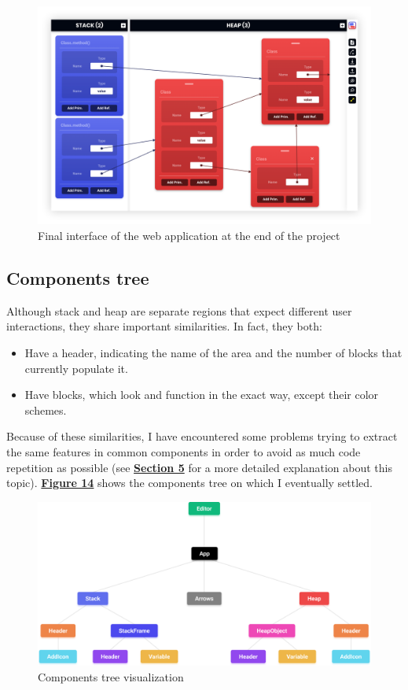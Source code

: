 \documentclass[]{usiinfbachelorproject}
\begin{document}
\begin{figure}[h!]
\centering
\includegraphics[width=\textwidth]{figures/final-interface.png}
\caption {Final interface of the web application at the end of the project}
\end{figure}
\subsection{Components tree}

Although stack and heap are separate regions that expect different user interactions, they share important similarities. In fact, they both:

\begin{itemize}
	\item Have a header, indicating the name of the area and the number of blocks that currently populate it.
	\item Have blocks, which look and function in the exact way, except their color schemes.
\end{itemize}

\noindent Because of these similarities, I have encountered some problems trying to extract the same features in common components in order to avoid as much code repetition as possible (see \hyperref[implementation]{\textbf{Section 5}} for a more detailed explanation about this topic). \hyperref[tree]{\textbf{Figure 14}} shows the components tree on which I eventually settled.

\bigskip

\begin{figure}[h!]
\centering
\includegraphics[width=\textwidth]{figures/tree.png}
\caption {Components tree visualization}
\label{tree}
\end{figure}
\end{document}
